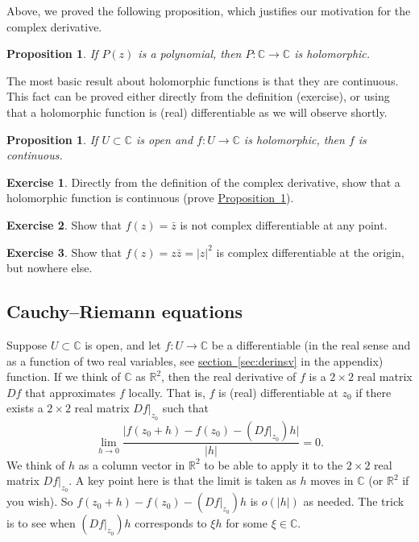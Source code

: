 \documentclass[12pt,openany]{book}
\newcommand{\sabs}[1]{\lvert {#1} \rvert}
\newcommand{\C}{{\mathbb{C}}}
\newcommand{\R}{{\mathbb{R}}}
\theoremstyle{plain}
\newtheorem{prop}[thm]{Proposition}
\theoremstyle{remark}
\theoremstyle{definition}
\newenvironment{exbox}{%
    \def\FrameCommand{\vrule width 1pt \relax\hspace{10pt}}%
    \MakeFramed{\advance\hsize-\width\FrameRestore}%
}{%
    \endMakeFramed
}
\theoremstyle{exercise}
\newtheorem{exercise}{Exercise}[section]
\theoremstyle{example}
\newcommand{\sectionref}[1]{\hyperref[#1]{section~\ref*{#1}}}
\newcommand{\propref}[1]{\hyperref[#1]{Proposition~\ref*{#1}}}
\begin{document}
Above, we proved the following proposition, which justifies our motivation
for the complex derivative.

\begin{prop}
If $P(z)$ is a polynomial, then $P \colon \C \to \C$ is holomorphic.
\end{prop}

The most basic result about holomorphic functions is that they are
continuous.
This fact can be proved either directly from the definition (exercise),
or using that a holomorphic function is
(real) differentiable as we will observe shortly.

\begin{prop} \label{prop:holiscont}
If $U \subset \C$ is open and $f \colon U \to \C$ is holomorphic, then $f$
is continuous.
\end{prop}

\begin{exbox}
\begin{exercise}
Directly from the definition of the complex derivative, show that a
holomorphic function is continuous (prove \propref{prop:holiscont}).
\end{exercise}

\begin{exercise}
Show that $f(z) = \bar{z}$ is not complex differentiable at any point.
\end{exercise}

\begin{exercise}
Show that $f(z) = z \bar{z} = \sabs{z}^2$ is complex differentiable
at the origin, but nowhere else.
\end{exercise}
\end{exbox}

\subsection{Cauchy--Riemann equations}

Suppose $U \subset \C$ is open, and
let $f \colon U \to \C$ be a
differentiable (in the real sense
and as a function of two real variables,
see \sectionref{sec:derinsv} in the appendix) function.
If we think of $\C$ as $\R^2$,
then the real derivative of $f$ is a $2 \times 2$ real matrix $D f$
that approximates $f$ locally.
That is, $f$ is (real) differentiable at $z_0$ if there exists
a $2 \times 2$ real matrix $Df|_{z_0}$ such that
\begin{equation*}
\lim_{h \to 0} \frac{\sabs{f(z_0+h) - f(z_0) - (Df|_{z_0}) h}}{\sabs{h}} = 0 .
\end{equation*}
We think of $h$ as a column vector in $\R^2$ 
to be able to apply it to the
$2 \times 2$ real matrix $Df|_{z_0}$.
A key point here is that the limit is taken
as $h$ moves in $\C$ (or $\R^2$ if you wish).
So $f(z_0+h) - f(z_0) - (Df|_{z_0}) h$ is $o(\sabs{h})$ as needed.
The trick is to see when $(Df|_{z_0}) h$ corresponds to $\xi h$
for some $\xi \in \C$.
\end{document}
